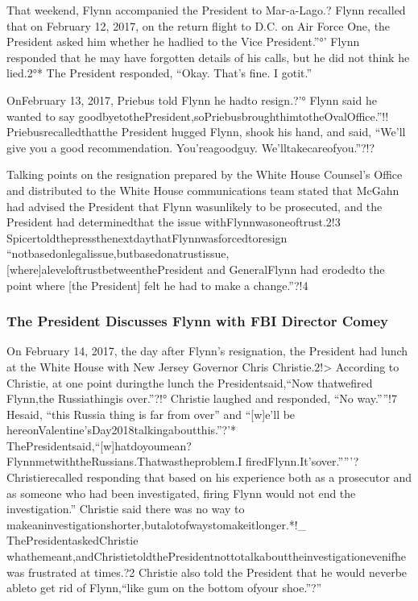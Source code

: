 That weekend, Flynn accompanied the President to Mar-a-Lago.? Flynn recalled that on February 12, 2017, on the return flight to D.C. on Air Force One, the President asked him whether he hadlied to the Vice President.”°’ Flynn responded that he may have forgotten details of his calls, but he did not think he lied.2°* The President responded, “Okay. That’s fine. I gotit.”

OnFebruary 13, 2017, Priebus told Flynn he hadto resign.?'° Flynn said he wanted to say goodbyetothePresident,soPriebusbroughthimtotheOvalOffice.”!! Priebusrecalledthatthe President hugged Flynn, shook his hand, and said, “We'll give you a good recommendation. You'reagoodguy. We’lltakecareofyou.”?!?

Talking points on the resignation prepared by the White House Counsel’s Office and distributed to the White House communications team stated that McGahn had advised the President that Flynn wasunlikely to be prosecuted, and the President had determinedthat the issue withFlynnwasoneoftrust.2!3 SpicertoldthepressthenextdaythatFlynnwasforcedtoresign “notbasedonlegalissue,butbasedonatrustissue,[where]aleveloftrustbetweenthePresident and GeneralFlynn had erodedto the point where [the President] felt he had to make a change.”?!4

\subsubsection{The President Discusses Flynn with FBI Director Comey}

On February 14, 2017, the day after Flynn’s resignation, the President had lunch at the White House with New Jersey Governor Chris Christie.2!> According to Christie, at one point duringthe lunch the Presidentsaid,“Now thatwefired Flynn,the Russiathingis over.”?!° Christie laughed and responded, “No way.””!7 Hesaid, “this Russia thing is far from over” and “[w]e’ll be hereonValentine’sDay2018talkingaboutthis.”?'* ThePresidentsaid,“[w]hatdoyoumean? FlynnmetwiththeRussians.Thatwastheproblem.I firedFlynn.It’sover.””'?Christierecalled responding that based on his experience both as a prosecutor and as someone who had been investigated, firing Flynn would not end the investigation.” Christie said there was no way to makeaninvestigationshorter,butalotofwaystomakeitlonger.*!_ ThePresidentaskedChristie whathemeant,andChristietoldthePresidentnottotalkabouttheinvestigationevenifhewas frustrated at times.?2 Christie also told the President that he would neverbe ableto get rid of Flynn,“like gum on the bottom ofyour shoe.”?”

